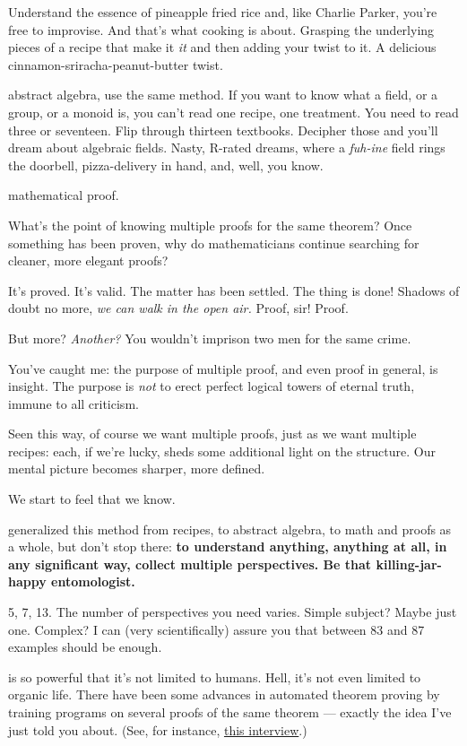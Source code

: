 Understand the essence of pineapple fried rice and, like Charlie Parker, you're free to improvise. And that's what cooking is about. Grasping the underlying pieces of a recipe
that make it \textit{it} and then adding your twist to it. A delicious
cinnamon-sriracha-peanut-butter twist.

 abstract algebra, use the same method. If you want to know what a field,
or a group, or a monoid is, you can't read one recipe, one treatment. You need
to read three or seventeen. Flip through thirteen textbooks. Decipher those and
you'll dream about algebraic fields. Nasty, R-rated dreams, where a
\textit{fuh-ine} field rings the doorbell, pizza-delivery in hand, and, well, you know.

 mathematical proof.

What's the point of knowing multiple proofs for the same theorem? Once something
has been proven, why do mathematicians continue searching for cleaner, more
elegant proofs?

It's proved. It's valid. The matter has been settled. The thing is done! Shadows
of doubt no more, \textit{we can walk in the open air.} Proof, sir! Proof.

But more? \textit{Another?} You wouldn't imprison two men for the same crime.

 You've caught me: the purpose of multiple proof, and even proof in
general, is insight. The purpose is \textit{not} to erect perfect logical
towers of eternal truth, immune to all criticism.

Seen this way, of course we want multiple proofs, just as we want multiple
recipes: each, if we're lucky, sheds some additional light on the structure. Our mental
picture becomes sharper, more defined.

We start to feel that we know.

 generalized this method from recipes, to abstract algebra, to math and proofs
as a whole, but don't stop there: \textbf{to understand anything, anything at all, in
  any significant way, collect multiple perspectives. Be that killing-jar-happy
  entomologist.}

5, 7, 13. The number of perspectives you need varies. Simple subject? Maybe just
one. Complex? I can (very scientifically) assure you that between 83 and 87
examples should be enough.

 is so powerful that it's not limited to humans. Hell, it's
not even limited to organic life. There have been some advances in
automated theorem proving by training programs on several proofs of
the same theorem --- exactly the idea I've just told you about. (See, for
instance, \href{http://intelligence.org/2013/12/21/josef-urban-on-machine-learning-and-automated-reasoning/}{this interview}.)



